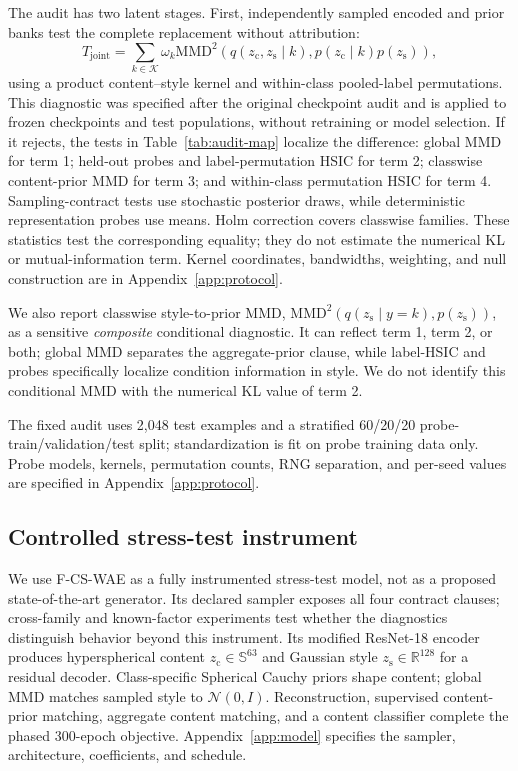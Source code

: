 \documentclass{article}
\newcommand{\ours}{F-CS-WAE}
\newcommand{\zc}{z_{\mathrm{c}}}
\newcommand{\zs}{z_{\mathrm{s}}}
\newcommand{\R}{\mathbb{R}}
\newcommand{\MMD}{\mathrm{MMD}}
\begin{document}
The audit has two latent stages.  First, independently sampled encoded and
prior banks test the complete replacement without attribution:
\begin{equation}
T_{\mathrm{joint}}=\sum_{k\in\mathcal K}\omega_k
\MMD^2\!\left(q(\zc,\zs\mid k),p(\zc\mid k)p(\zs)\right),
\label{eq:direct-joint}
\end{equation}
using a product content--style kernel and within-class pooled-label
permutations.  This diagnostic was specified after the original checkpoint
audit and is applied to frozen checkpoints and test populations, without
retraining or model selection.  If it rejects,
the tests in Table~\ref{tab:audit-map} localize the difference: global MMD for
term 1; held-out probes and label-permutation HSIC for term 2; classwise
content-prior MMD for term 3; and within-class permutation HSIC for term 4.
Sampling-contract tests use stochastic posterior draws, while deterministic
representation probes use means.  Holm correction covers classwise families.
These statistics test the corresponding equality; they do not estimate the
numerical KL or mutual-information term.  Kernel coordinates, bandwidths,
weighting, and null construction are in Appendix~\ref{app:protocol}.

We also report classwise style-to-prior MMD,
$\MMD^2(q(\zs\mid y=k),p(\zs))$, as a sensitive \emph{composite} conditional
diagnostic.  It can reflect term 1, term 2, or both; global MMD separates the
aggregate-prior clause, while label-HSIC and probes specifically localize
condition information in style.  We do not identify this conditional MMD with
the numerical KL value of term 2.

The fixed audit uses 2,048 test examples and a stratified 60/20/20
probe-train/validation/test split; standardization is fit on probe training
data only.  Probe models, kernels, permutation counts, RNG separation, and
per-seed values are specified in Appendix~\ref{app:protocol}.

\subsection{Controlled stress-test instrument}

We use \ours{} as a fully instrumented stress-test model, not as a proposed
state-of-the-art generator.  Its declared sampler exposes all four contract
clauses; cross-family and known-factor experiments test whether the diagnostics
distinguish behavior beyond this instrument.  Its modified
ResNet-18 encoder produces hyperspherical content
$\zc\in\mathbb S^{63}$ and Gaussian style $\zs\in\R^{128}$ for a residual
decoder.  Class-specific Spherical Cauchy priors shape content; global MMD
matches sampled style to $\mathcal N(0,I)$.  Reconstruction, supervised
content-prior matching, aggregate content matching, and a content classifier
complete the phased 300-epoch objective.  Appendix~\ref{app:model} specifies
the sampler, architecture, coefficients, and schedule.
\end{document}
